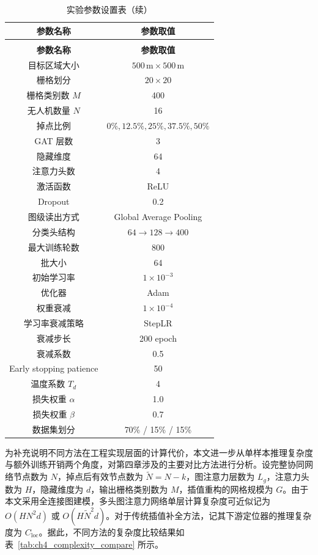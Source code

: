 \begingroup
\setlength{\LTleft}{\fill}
\setlength{\LTright}{\fill}
\begin{longtable}{cc}
    \caption{实验参数设置表}
    \label{tab:ch4_hyperparameters}\\
    \toprule
    \textbf{参数名称} & \textbf{参数取值} \\
    \midrule
    \endfirsthead
    \caption[]{实验参数设置表（续）}\\
    \toprule
    \textbf{参数名称} & \textbf{参数取值} \\
    \midrule
    \endhead
    目标区域大小 & \(500\,\mathrm{m}\times500\,\mathrm{m}\) \\
    栅格划分 & \(20\times20\) \\
    栅格类别数 \(M\) & 400 \\
    无人机数量 \(N\) & 16 \\
    掉点比例 & \(0\%,12.5\%,25\%,37.5\%,50\%\) \\
    GAT 层数 & 3 \\
    隐藏维度 & 64 \\
    注意力头数 & 4 \\
    激活函数 & ReLU \\
    Dropout & 0.2 \\
    图级读出方式 & Global Average Pooling \\
    分类头结构 & \(64 \rightarrow 128 \rightarrow 400\) \\
    最大训练轮数 & 800 \\
    批大小 & 64 \\
    初始学习率 & \(1\times10^{-3}\) \\
    优化器 & Adam \\
    权重衰减 & \(1\times10^{-4}\) \\
    学习率衰减策略 & StepLR \\
    衰减步长 & 200 epoch \\
    衰减系数 & 0.5 \\
    Early stopping patience & 50 \\
    温度系数 \(T_d\) & 4 \\
    损失权重 \(\alpha\) & 1.0 \\
    损失权重 \(\beta\) & 0.7 \\
    数据集划分 & 70\% / 15\% / 15\% \\
    \bottomrule
\end{longtable}
\endgroup

为补充说明不同方法在工程实现层面的计算代价，本文进一步从单样本推理复杂度与额外训练开销两个角度，对第四章涉及的主要对比方法进行分析。设完整协同网络节点数为 \(N\)，掉点后有效节点数为 \(\tilde{N}=N-k\)，图注意力层数为 \(L_g\)，注意力头数为 \(H\)，隐藏维度为 \(d\)，输出栅格类别数为 \(M\)，插值重构的网格规模为 \(G\)。由于本文采用全连接图建模，多头图注意力网络单层计算复杂度可近似记为 \(O(HN^2d)\) 或 \(O(H\tilde{N}^2d)\)。对于传统插值补全方法，记其下游定位器的推理复杂度为 \(C_{\mathrm{loc}}\)。据此，不同方法的复杂度比较结果如表~\ref{tab:ch4_complexity_compare} 所示。

